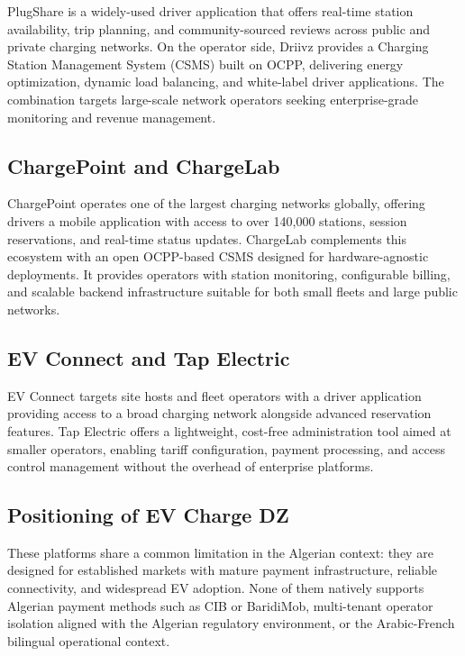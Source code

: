 \documentclass[12pt,a4paper]{report}
\begin{document}
PlugShare is a widely-used driver application that offers real-time station availability,
trip planning, and community-sourced reviews across public and private charging networks.
On the operator side, Driivz provides a Charging Station Management System (CSMS) built
on OCPP, delivering energy optimization, dynamic load balancing, and white-label driver
applications. The combination targets large-scale network operators seeking enterprise-grade
monitoring and revenue management.

\subsection{ChargePoint and ChargeLab}

ChargePoint operates one of the largest charging networks globally, offering drivers a
mobile application with access to over 140{,}000 stations, session reservations, and
real-time status updates. ChargeLab complements this ecosystem with an open OCPP-based
CSMS designed for hardware-agnostic deployments. It provides operators with station
monitoring, configurable billing, and scalable backend infrastructure suitable for both
small fleets and large public networks.

\subsection{EV Connect and Tap Electric}

EV Connect targets site hosts and fleet operators with a driver application providing
access to a broad charging network alongside advanced reservation features. Tap Electric
offers a lightweight, cost-free administration tool aimed at smaller operators, enabling
tariff configuration, payment processing, and access control management without the
overhead of enterprise platforms.

\subsection{Positioning of EV Charge DZ}

These platforms share a common limitation in the Algerian context: they are designed for
established markets with mature payment infrastructure, reliable connectivity, and
widespread EV adoption. None of them natively supports Algerian payment methods such as
CIB or BaridiMob, multi-tenant operator isolation aligned with the Algerian regulatory
environment, or the Arabic-French bilingual operational context.
\end{document}
